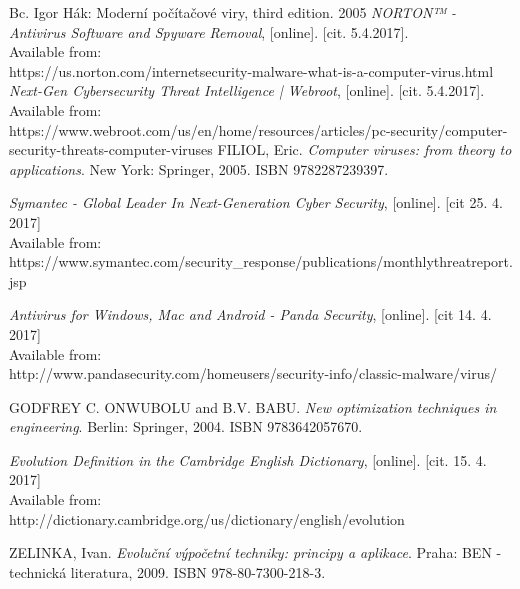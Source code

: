 \documentclass[review]{elsarticle}
\begin{document}
\begin{thebibliography}{99}
	 Bc. Igor Hák: Moderní počítačové viry, third edition. 2005
	 \textit{NORTON™ - Antivirus Software and Spyware Removal}, [online]. [cit. 5.4.2017]. \\ Available from: \\ 
	https://us.norton.com/internetsecurity-malware-what-is-a-computer-virus.html
	 \textit{Next-Gen Cybersecurity Threat Intelligence | Webroot}, [online]. [cit. 5.4.2017]. \\ Available from: \\
	https://www.webroot.com/us/en/home/resources/articles/pc-security/computer-security-threats-computer-viruses
	FILIOL, Eric. \textit{Computer viruses: from theory to applications}. New York: Springer, 2005. ISBN 9782287239397.
	
	 \textit{Symantec - Global Leader In Next-Generation Cyber Security}, [online]. [cit 25. 4. 2017] \\
	Available from: \\
	https://www.symantec.com/security\_response/publications/monthlythreatreport.jsp
	
	 \textit{Antivirus for Windows, Mac and Android - Panda Security}, [online]. [cit 14. 4. 2017] \\ Available from: \\
	http://www.pandasecurity.com/homeusers/security-info/classic-malware/virus/
	
	 GODFREY C. ONWUBOLU and B.V. BABU. \textit{New optimization techniques in engineering}. Berlin: Springer, 2004. ISBN 9783642057670.

	 \textit{Evolution Definition in the Cambridge English Dictionary}, [online]. [cit. 15. 4. 2017] \\ Available from: \\
	http://dictionary.cambridge.org/us/dictionary/english/evolution	
	
	 ZELINKA, Ivan. \textit{Evoluční výpočetní techniky: principy a aplikace}. Praha: BEN - technická literatura, 2009. ISBN 978-80-7300-218-3.

\end{thebibliography}
\end{document}
